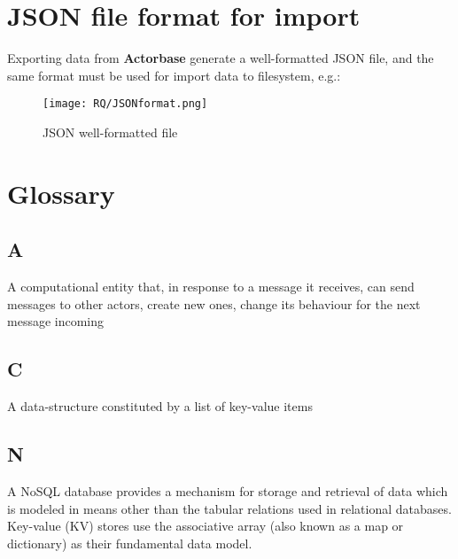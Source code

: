 \documentclass{scalatekids-article}
\begin{document}
\newpage
\appendix

\section{JSON file format for import}
\label{sec:JSONFormat}
Exporting data from \textbf{Actorbase} generate a well-formatted JSON file, and the same format must be
used for import data to filesystem, e.g.:

\begin{figure}[H]
  \begin{center}
    \texttt{[image: RQ/JSONformat.png]}
    \caption{JSON well-formatted file}
  \end{center}
\end{figure}

\listoffigures

\section{Glossary}
\label{sec:glossary}
\subsection{A}
   A computational entity that, in response to a message
  it receives, can send messages to other actors, create new ones, change its
  behaviour for the next message incoming\label{actor} \\
\subsection{C}
   A data-structure constituted by a list of key-value items\label{coll} \\
\subsection{N}
   A NoSQL database provides a mechanism for storage and retrieval
  of data which is modeled in means other than the tabular relations used in
  relational databases. Key-value (KV) stores use the associative array (also known
  as a map or dictionary) as their fundamental data model.\label{nosql}
\end{document}

